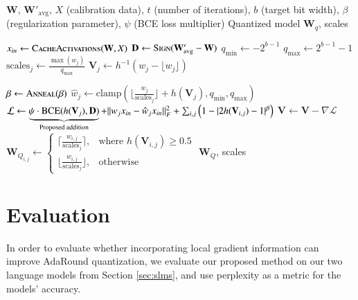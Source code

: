 \documentclass[../main.tex]{subfiles}
\begin{document}
\begin{algorithm}[H]
\caption{Gradient-Aware Adaptive Rounding (Quantization)}\label{alg:gradient_aware_adaround_quantization}
\begin{algorithmic}[1]
\Require $\mathbf{W}$, $\mathbf{W}'_{\text{avg}}$, $X$ (calibration data), $t$ (number of iterations), $b$ (target bit width), $\beta$ (regularization parameter), $\psi$ (BCE loss multiplier)
\Ensure Quantized model $\mathbf{W}_q$, scales

\State $x_{in} \gets \textsc{CacheActivations}(\mathbf{W}, X)$ 
\State $\mathbf{D} \gets \textsc{Sign}(\mathbf{W}'_{\text{avg}} - \mathbf{W})$
\State $q_{\text{min}} \gets -2^{b - 1}$
\State $q_{\text{max}} \gets 2^{b - 1} - 1$
\State $\text{scales}_j \gets \frac{\max(w_j)}{q_{\text{max}}}$ 
\State $\mathbf{V}_j \gets h^{-1}(w_j - \lfloor w_j \rfloor)$ 

\State $\beta \gets \textsc{Anneal}(\beta)$
\State $\hat{w}_j \gets \text{clamp}\left(\lfloor \frac{w_j}{\text{scales}_j} \rfloor + h(\mathbf{V}_j), q_\text{min}, q_\text{max}\right)$
\State $\mathcal{L} \gets \underbrace{\psi \cdot \textsc{BCE}(h(\mathbf{V}_j), \mathbf{D})}_{\text{Proposed addition}} + \|w_j x_{in} - \hat{w}_j x_{in}\|_F^2 + \sum_{i, j} \left(1 - \lvert 2h(\mathbf{V}_{i,j}) - 1\rvert^\beta\right)$
\State $\mathbf{V} \gets \mathbf{V} - \nabla \mathcal{L}$ 
\EndFor
\State $\mathbf{W}_{Q_{i, j}} \gets \begin{cases}
    \lceil \frac{w_{i, j}}{\text{scales}_j} \rceil, &\text{where } h(\mathbf{V}_{i,j}) \geq 0.5 \\
    \lfloor \frac{w_{i, j}}{\text{scales}_j} \rfloor, &\text{otherwise}
\end{cases}$ 
\EndFor
\State \Return $\mathbf{W}_Q$, scales
\end{algorithmic}
\end{algorithm}

\section{Evaluation}
In order to evaluate whether incorporating local gradient information can improve AdaRound quantization, we evaluate our proposed method on our two language models from Section \ref{sec:slms}, and use perplexity as a metric for the models' accuracy.
\end{document}
